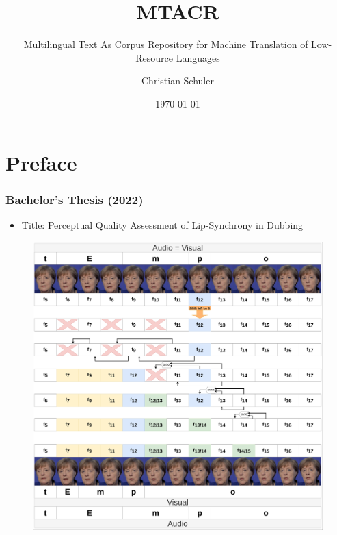 \documentclass[aspectratio=169]{beamer}
\title[MTACR]{MTACR}
\subtitle{Multilingual Text As Corpus Repository for Machine Translation of Low-Resource Languages}
\author{Christian Schuler}
\institute{Funded Student's Project\\University of Hamburg and beyond}
\date{\today}
\begin{document}
\begin{frame}
	\titlepage
\end{frame}


\section{Preface}

\begin{frame}[fragile]
	\frametitle{Bachelor's Thesis (2022)}
    \begin{itemize}
        \item Title: Perceptual Quality Assessment of Lip-Synchrony in Dubbing
    \end{itemize}
    \begin{minipage}{.5\textwidth}
      \begin{figure}
        \centering
        \includegraphics[width=.9\textwidth]{images/DubbingThesisEditing-vL-merkl.png} 
    \end{figure}
    \end{minipage}%
    \begin{minipage}{.5\textwidth}
    \centering
        \begin{minipage}{.3\textwidth}

\end{minipage}
\end{minipage}
\end{frame}
\end{document}
